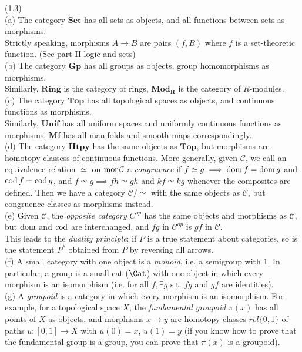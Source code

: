 \documentclass[a4paper]{article}
\begin{document}
\begin{eg} (1.3)\\
    (a) The category $\mathbf{Set}$ has all sets as objects, and all functions between sets as morphisms.\\
    Strictly speaking, morphisms $A \to B$ are pairs $(f,B)$ where $f$ is a set-theoretic function. (See part II logic and sets)\\
    (b) The category $\mathbf{Gp}$ has all groups as objects, group homomorphisms as morphisms.\\
    Similarly, $\mathbf{Ring}$ is the category of rings, $\mathbf{Mod_R}$ is the category of $R$-modules.\\
    (c) The category $\mathbf{Top}$ has all topological spaces as objects, and continuous functions as morphisms.\\
    Similarly, $\mathbf{Unif}$ has all uniform spaces and uniformly continuous functions as morphisms, $\mathbf{Mf}$ has all manifolds and smooth maps correspondingly.\\
    (d) The category $\mathbf{Htpy}$ has the same objects as $\mathbf{Top}$, but morphisms are homotopy classess of continuous functions. More generally, given $\mathcal{C}$, we call an equivalence relation $\simeq$ on $\operatorname{mor} \mathcal{C}$ a \emph{congruence} if $f \simeq g \implies \operatorname{dom} f = \operatorname{dom} g$ and $\operatorname{cod} f = \operatorname{cod} g$, and $f \simeq g \implies fh \simeq gh$ and $kf \simeq kg$ whenever the composites are defined. Then we have a category $\mathcal{C} / \simeq$ with the same objects as $\mathcal{C}$, but congruence classes as morphisms instead.\\
    (e) Given $\mathcal{C}$, the \emph{opposite category} $C^{op}$ has the same objects and morphisms as $\mathcal{C}$, but $\operatorname{dom}$ and $\operatorname{cod}$ are interchanged, and $fg$ in $\mathcal{C}^{op}$ is $gf$ in $\mathcal{C}$.\\
    This leads to the \emph{duality principle}: if $P$ is a true statement about categories, so is the statement $P^*$ obtained from $P$ by reversing all arrows.\\
    (f) A small category with one object is a \emph{monoid}, i.e. a semigroup with $1$. In particular, a group is a small cat ($\Cat$) with one object in which every morphism is an isomorphism (i.e. for all $f, \exists g$ s.t. $fg$ and $gf$ are identities).\\
    (g) A \emph{groupoid} is a category in which every morphism is an isomorphism. For example, for a topological space $X$, the \emph{fundamental groupoid} $\pi(x)$ has all points of $X$ as objects, and morphisms $x \to y$ are homotopy classes $rel\{0,1\}$ of paths $u:[0,1] \to X$ with $u(0) = x$, $u(1) = y$ (if you know how to prove that the fundamental group is a group, you can prove that $\pi(x)$ is a groupoid).\\

\end{eg}
\end{document}
